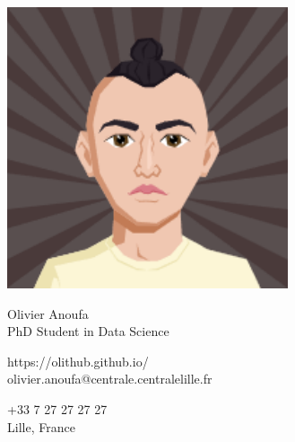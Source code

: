 \documentclass{article}
\begin{document}
\centering \includegraphics[width=.2\linewidth]{logo}\\[5pt]
\parbox{2in}{\Large \centering Olivier Anoufa\\[1pt]
\normalsize PhD Student in Data Science}

\vfill
\raggedright
\begin{multicols}{2}
https://olithub.github.io/\\
olivier.anoufa@centrale.centralelille.fr

\columnbreak
\raggedleft
+33 7 27 27 27 27\\
Lille, France%
\end{multicols}%
\end{document}
